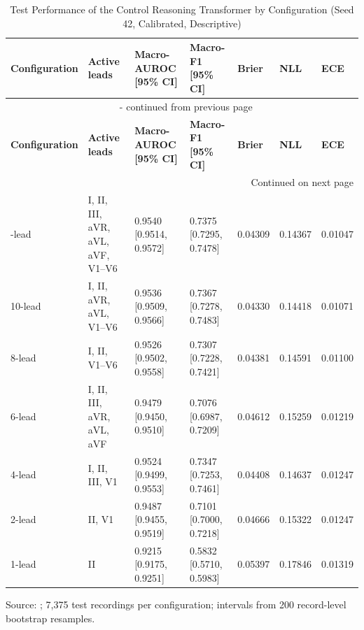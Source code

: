 {\scriptsize
\setlength{\tabcolsep}{2pt}
\renewcommand{\arraystretch}{1.12}
\setlength{\LTcapwidth}{\textwidth}
\begin{longtable}{|p{}|p{}|p{}|p{}|p{}|p{}|p{}|}
\caption[Test Performance by Configuration]{Test Performance of the Control Reasoning Transformer by Configuration (Seed 42, Calibrated, Descriptive)}\label{tab:ch4_7}\\
\hline
\textbf{Configuration} & \textbf{Active leads} & \textbf{Macro-AUROC [95\% CI]} & \textbf{Macro-F1 [95\% CI]} & \textbf{Brier} & \textbf{NLL} & \textbf{ECE} \\ \hline
\endfirsthead
\multicolumn{7}{c}{\tablename~\thetable{} - continued from previous page} \\ \hline
\textbf{Configuration} & \textbf{Active leads} & \textbf{Macro-AUROC [95\% CI]} & \textbf{Macro-F1 [95\% CI]} & \textbf{Brier} & \textbf{NLL} & \textbf{ECE} \\ \hline
\endhead
\hline
\multicolumn{7}{r}{Continued on next page} \\
\endfoot
\hline
\endlastfoot
12-lead & I, II, III, aVR, aVL, aVF, V1–V6 & 0.9540 [0.9514, 0.9572] & 0.7375 [0.7295, 0.7478] & 0.04309 & 0.14367 & 0.01047 \\ \hline
10-lead & I, II, aVR, aVL, V1–V6 & 0.9536 [0.9509, 0.9566] & 0.7367 [0.7278, 0.7483] & 0.04330 & 0.14418 & 0.01071 \\ \hline
8-lead & I, II, V1–V6 & 0.9526 [0.9502, 0.9558] & 0.7307 [0.7228, 0.7421] & 0.04381 & 0.14591 & 0.01100 \\ \hline
6-lead & I, II, III, aVR, aVL, aVF & 0.9479 [0.9450, 0.9510] & 0.7076 [0.6987, 0.7209] & 0.04612 & 0.15259 & 0.01219 \\ \hline
4-lead & I, II, III, V1 & 0.9524 [0.9499, 0.9553] & 0.7347 [0.7253, 0.7461] & 0.04408 & 0.14637 & 0.01247 \\ \hline
2-lead & II, V1 & 0.9487 [0.9455, 0.9519] & 0.7101 [0.7000, 0.7218] & 0.04666 & 0.15322 & 0.01247 \\ \hline
1-lead & II & 0.9215 [0.9175, 0.9251] & 0.5832 [0.5710, 0.5983] & 0.05397 & 0.17846 & 0.01319 \\ \hline
\end{longtable}
}

{\small Source: ; 7,375 test recordings per configuration; intervals from 200 record-level bootstrap resamples.}

